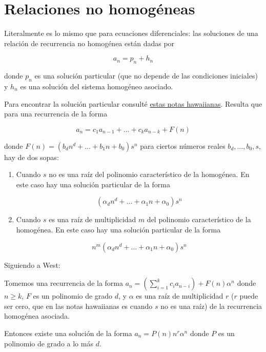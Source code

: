 \section{Relaciones no homogéneas}
\label{section-relaciones-no-homogeneas}
Literalmente es lo mismo que para ecuaciones
diferenciales: las soluciones de una relación
de recurrencia no homogénea están dadas por

$$
a_n=p_n+h_n
$$

donde $p_n$ es una solución particular (que
no depende de las condiciones iniciales) y
$h_n$ es una solución del sistema homogéneo
asociado.

Para encontrar la solución particular
consulté
\href{https://courses.ics.hawaii.edu/%
ReviewICS241/morea/counting/%
RecurrenceRelations2-QA.pdf}{estas
notas hawaiianas}. Resulta que para una
recurrencia de la forma

$$
a_n=c_1a_{n-1}+\ldots+c_ka_{n-k}+F(n)
$$

donde $F(n) = (b_dn^d +  \ldots + b_1n +
b_0)s^n$ para ciertos números reales $b_d,
\ldots,b_0,s$, hay de dos sopas:
\begin{enumerate}
\item Cuando $s$ no es una raíz del polinomio
característico de la homogénea. En este caso
hay una solución particular de la forma

$$
(\alpha_dn^d+\ldots+\alpha_1n+\alpha_0)s^n
$$

\item Cuando $s$ es una raíz de multiplicidad
$m$ del polinomio característico de la
homogénea. En este caso hay una solución
particular de la forma

$$
n^m(\alpha_dn^d+\ldots+\alpha_1n+\alpha_0)s^n
$$

\end{enumerate}

Siguiendo a West:
\begin{theorem}
\label{theorem-combi-002}
Tomemos una recurrencia de la forma $a_n = (
\sum_{i = 1}^kc_ia_{n-i}) + F(n)\alpha^n$
donde $n\geq k$, $F$ es un polinomio de grado
$d$, y $\alpha$ es una raíz de multiplicidad
$r$ ($r$ puede ser cero, que en las notas
hawaiianas es cuando $s$ no es una raíz) de
la recurrencia homogénea asociada.

Entonces existe una solución de la forma $a_n
= P(n)n^r\alpha^n$ donde $P$ es un polinomio
de grado a lo más $d$.
\end{theorem}

